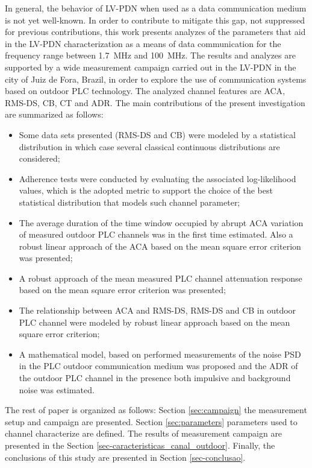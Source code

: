 \documentclass[journal]{IEEEtran}
\begin{document}
In general, the behavior of \ac{LV-PDN} when used as a data communication medium is not yet well-known. In order to contribute to mitigate this gap, not suppressed  for previous contributions, this work presents analyzes of the parameters that aid in the \ac{LV-PDN} characterization as a means of data communication for the frequency range between 1.7~MHz and 100~MHz. The
 results and analyzes are supported by a wide measurement campaign carried out in the \ac{LV-PDN} in the city of Juiz de Fora, Brazil, in order to explore the use of communication systems based on outdoor \ac{PLC} technology. The analyzed channel features are \ac{ACA}, \ac{RMS-DS}, \ac{CB}, \ac{CT} and \ac{ADR}.
The main contributions of the present investigation are summarized as follows:
\begin{itemize}
	\item Some data sets presented (\ac{RMS-DS} and \ac{CB}) were modeled by a statistical distribution in which case several classical continuous distributions are considered;
	\item Adherence tests were conducted by evaluating the associated log-likelihood values, which is the adopted metric to support the choice of the best statistical distribution that models such channel parameter;
	\item The average duration of the time window occupied by abrupt \ac{ACA} variation of measured outdoor PLC channels was in the first time estimated. Also a robust linear approach of the \ac{ACA} based on the mean square error criterion was presented;
	\item A robust approach of the mean measured PLC channel attenuation response based on the mean square error criterion was presented;
	\item The relationship between ACA and RMS-DS, RMS-DS and CB in outdoor \ac{PLC} channel were modeled by robust linear approach based on the mean square error criterion; 
	\item A mathematical model, based on performed measurements of the noise \ac{PSD} in the \ac{PLC} outdoor communication medium was proposed and the \ac{ADR} of the outdoor PLC channel in the presence both impulsive and background noise was estimated.
\end{itemize}

The rest of paper is organized as follows: Section \ref{sec:campaign} the measurement setup and campaign are presented. Section \ref{sec:parameters} parameters used to channel characterize are defined. The results of measurement campaign are presented in the Section \ref{sec-caracteristicas_canal_outdoor}. Finally, the conclusions of this study are presented in Section \ref{sec-conclusao}.
\end{document}
